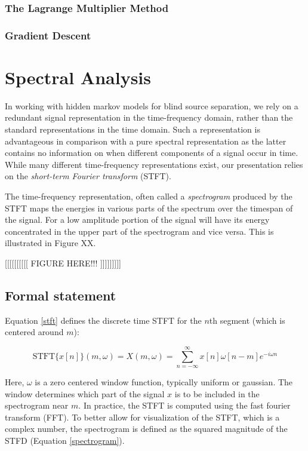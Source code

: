 \documentclass[11pt, oneside, a4paper]{report}
\begin{document}
\subsubsection{The Lagrange Multiplier Method}

\subsubsection{Gradient Descent}


\section{Spectral Analysis}

In working with hidden markov models for blind source separation, we
rely on a redundant signal representation in the time-frequency
domain, rather than the standard representations in the time
domain. Such a representation is advantageous in comparison with a
pure spectral representation as the latter contains no information on
when different components of a signal occur in time. While many
different time-frequency representations exist, our presentation
relies on the \emph{short-term Fourier transform} (STFT).

The time-frequency representation, often called a \emph{spectrogram} produced by the STFT maps the
energies in various parts of the spectrum over the timespan of the
signal. For a low amplitude portion of the signal will have its energy
concentrated in the upper part of the spectrogram and vice versa. This
is illustrated in Figure XX.

[[[[[[[[[[ FIGURE HERE!!! ]]]]]]]]]

\subsection{Formal statement}

Equation \ref{stft} defines the discrete time STFT for the $n$th
segment (which is centered around $m$):

\begin{equation}\label{stft}
  \text{STFT}\{x[n]\}(m,\omega)= X(m,\omega) =\sum_{n = -\infty}^{\infty}
  x[n]\omega[n-m]e^{-i\omega n}
\end{equation}

Here, $\omega$ is a zero centered window function, typically uniform
or gaussian. The window determines which part of the signal $x$ is to
be included in the spectrogram near $m$. In practice, the STFT is
computed using the fast fourier transform (FFT). To better allow for
visualization of the STFT, which is a complex number, the spectrogram
is defined as the squared magnitude of the STFD (Equation \ref{spectrogram}).
\end{document}
